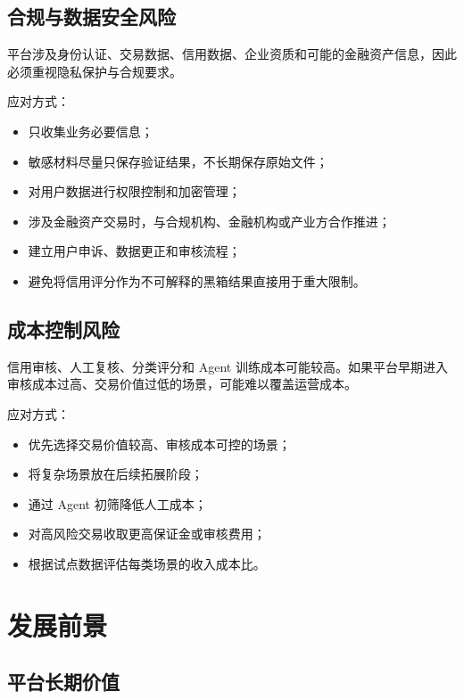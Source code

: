 \documentclass[UTF8,a4paper,12pt]{ctexart}
\begin{document}
\subsection{合规与数据安全风险}

平台涉及身份认证、交易数据、信用数据、企业资质和可能的金融资产信息，因此必须重视隐私保护与合规要求。

应对方式：

\begin{itemize}
    \item 只收集业务必要信息；
    \item 敏感材料尽量只保存验证结果，不长期保存原始文件；
    \item 对用户数据进行权限控制和加密管理；
    \item 涉及金融资产交易时，与合规机构、金融机构或产业方合作推进；
    \item 建立用户申诉、数据更正和审核流程；
    \item 避免将信用评分作为不可解释的黑箱结果直接用于重大限制。
\end{itemize}

\subsection{成本控制风险}

信用审核、人工复核、分类评分和 Agent 训练成本可能较高。如果平台早期进入审核成本过高、交易价值过低的场景，可能难以覆盖运营成本。

应对方式：

\begin{itemize}
    \item 优先选择交易价值较高、审核成本可控的场景；
    \item 将复杂场景放在后续拓展阶段；
    \item 通过 Agent 初筛降低人工成本；
    \item 对高风险交易收取更高保证金或审核费用；
    \item 根据试点数据评估每类场景的收入成本比。
\end{itemize}

\section{发展前景}

\subsection{平台长期价值}
\end{document}
